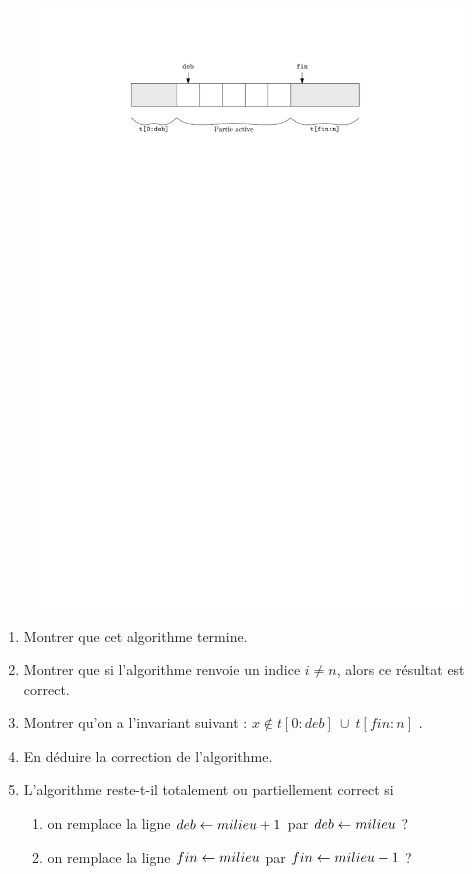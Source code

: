 \documentclass{magnolia}
\begin{document}
    \begin{figure}[H]
      \centering
      \begin{center}
        \includegraphics[scale=0.8]{../../Commun/Images/info-cours-correction-dichotomie.pdf}
        \end{center}
    \end{figure}
    \begin{enumerate}
      \item Montrer que cet algorithme termine.
      \item Montrer que si l'algorithme renvoie un indice $i \neq n$, alors ce
            résultat est correct.
      \item Montrer qu'on a l'invariant suivant :
            \og $x \notin t[0:deb]\ \cup\ t[fin:n]$ \fg.
      \item En déduire la correction de l'algorithme.
      \item L'algorithme reste-t-il totalement ou partiellement correct si
            \begin{enumerate}
              \item on remplace la ligne $deb \leftarrow milieu + 1$ par
                    $deb \leftarrow milieu$ ?
              \item on remplace la ligne $fin \leftarrow milieu$ par
                    $fin \leftarrow milieu - 1$ ?
            \end{enumerate}
    \end{enumerate}
\end{document}
